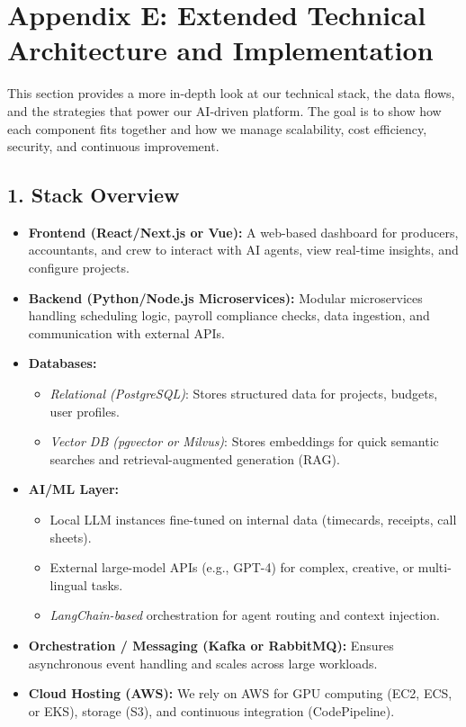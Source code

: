 \documentclass[11pt]{article}
\begin{document}
\clearpage
\section{Appendix E: Extended Technical Architecture and Implementation}
\label{appendix:extended-tech}

This section provides a more in-depth look at our technical stack, the data flows, and the strategies that power our AI-driven platform. The goal is to show how each component fits together and how we manage scalability, cost efficiency, security, and continuous improvement.

\subsection{1. Stack Overview}
\begin{itemize}
    \item \textbf{Frontend (React/Next.js or Vue):} A web-based dashboard for producers, accountants, and crew to interact with AI agents, view real-time insights, and configure projects.
    \item \textbf{Backend (Python/Node.js Microservices):} Modular microservices handling scheduling logic, payroll compliance checks, data ingestion, and communication with external APIs.
    \item \textbf{Databases:}
    \begin{itemize}
        \item \emph{Relational (PostgreSQL)}: Stores structured data for projects, budgets, user profiles.
        \item \emph{Vector DB (pgvector or Milvus)}: Stores embeddings for quick semantic searches and retrieval-augmented generation (RAG).
    \end{itemize}
    \item \textbf{AI/ML Layer:}
    \begin{itemize}
        \item Local LLM instances fine-tuned on internal data (timecards, receipts, call sheets).
        \item External large-model APIs (e.g., GPT-4) for complex, creative, or multi-lingual tasks.
        \item \emph{LangChain-based} orchestration for agent routing and context injection.
    \end{itemize}
    \item \textbf{Orchestration / Messaging (Kafka or RabbitMQ):} Ensures asynchronous event handling and scales across large workloads.
    \item \textbf{Cloud Hosting (AWS):} We rely on AWS for GPU computing (EC2, ECS, or EKS), storage (S3), and continuous integration (CodePipeline).
\end{itemize}
\end{document}
